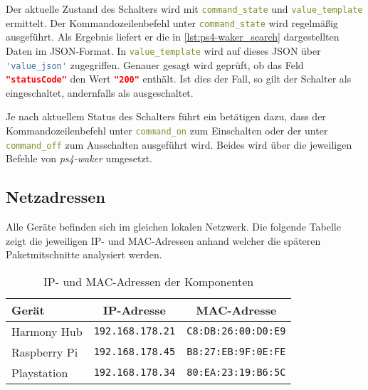 Der aktuelle Zustand des Schalters wird mit \lstinline[language=yaml]{command_state} und
\lstinline[language=yaml]{value_template} ermittelt.
Der Kommandozeilenbefehl unter \lstinline[language=yaml]{command_state} wird regelmäßig ausgeführt.
Als Ergebnis liefert er die in \autoref{lst:ps4-waker_search} dargestellten Daten im JSON-Format.
In \lstinline[language=yaml]{value_template} wird auf dieses JSON über
\lstinline[language=yaml]{'value_json'} zugegriffen.
Genauer gesagt wird geprüft,
ob das Feld \lstinline[language=json]{"statusCode"} den Wert
\lstinline[language=json]{"200"} enthält.
Ist dies der Fall, so gilt der Schalter als eingeschaltet, andernfalls als ausgeschaltet.



Je nach aktuellem Status des Schalters führt ein betätigen dazu, dass der Kommandozeilenbefehl unter \lstinline[language=yaml]{command_on} zum Einschalten
oder der unter \lstinline[language=yaml]{command_off} zum Ausschalten ausgeführt wird.
Beides wird über die jeweiligen Befehle von \textit{ps4-waker} umgesetzt.


\subsection{Netzadressen}\label{sec:aufbau-adressen}
Alle Geräte befinden sich im gleichen lokalen Netzwerk.
Die folgende Tabelle zeigt die jeweiligen IP- und MAC-Adressen anhand welcher die
späteren Paketmitschnitte analysiert werden.

\begin{table}[h!]
    \centering
    \begin{tabular}{l||c|c}
        Gerät           & IP-Adresse      &  MAC-Adresse          \\
        \hline
        \hline
        Harmony Hub     & \texttt{192.168.178.21}  &  \texttt{C8:DB:26:00:D0:E9}  \\
        \hline
        Raspberry Pi    & \texttt{192.168.178.45}  &  \texttt{B8:27:EB:9F:0E:FE}  \\
        \hline
        Playstation     & \texttt{192.168.178.34}  &  \texttt{80:EA:23:19:B6:5C}   \\
    \end{tabular}
    \caption{IP- und MAC-Adressen der Komponenten}
    \label{ex:netzadressen}
\end{table}